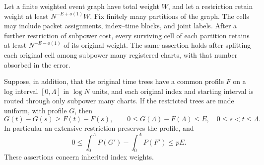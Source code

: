 \begin{lemma}
\label{lem:estimate-cleaning}
Let a finite weighted event graph have total weight $W$, and let a
restriction retain weight at least $N^{-E+o(1)}W$. Fix finitely many
partitions of the graph. The cells may include packet assignments,
index--time blocks, and joint labels. After a further restriction of
subpower cost, every surviving
cell of each partition retains at least $N^{-E-o(1)}$ of its original
weight. The same assertion holds after splitting each original cell
among subpower many registered charts, with that number absorbed in
the error.

Suppose, in addition, that the original time trees have a common
profile $F$ on a log interval $[0,\Lambda]$ in $\log N$ units, and each
original index and starting interval is routed through only subpower
many charts. If the restricted trees are made uniform, with profile
$G$, then
\begin{equation}
 G(t)-G(s)\ge F(t)-F(s),\qquad
 0\le G(\Lambda)-F(\Lambda)\le E,
 \quad 0\le s<t\le\Lambda.
\label{eq:estimate-branch-loss}
\end{equation}
In particular an extensive restriction preserves the profile, and
\begin{equation}
 0\le \int_0^\Lambda P(G')-\int_0^\Lambda P(F')\le pE.
\label{eq:estimate-cost-loss}
\end{equation}
These assertions concern inherited index weights.
\end{lemma}

